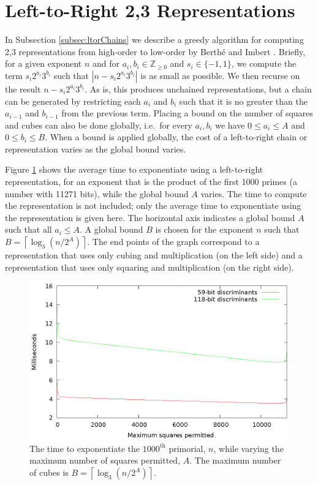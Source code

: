 \documentclass{ucalgthes1}
\theoremstyle{definition}
\newcommand{\ZZgez}{\mathbb{Z}_{\ge 0}}
\newcommand{\ceil}[1]{\left\lceil #1 \right\rceil}
\begin{document}
\section{Left-to-Right 2,3 Representations}
\label{sec:expL2RChains}

In Subsection \ref{subsec:ltorChains} we describe a greedy algorithm for computing 2,3 representations from high-order to low-order by Berth{\'e} and Imbert \cite{Berthe2009}.  Briefly, for a given exponent $n$ and for $a_i, b_i \in \ZZgez$ and \mbox{$s_i \in \{-1, 1\}$}, we compute the term $s_i2^{a_i}3^{b_i}$ such that $\left|n-s_i2^{a_i}3^{b_i}\right|$ is as small as possible.  We then recurse on the result $n - s_i2^{a_i}3^{b_i}$.  As is, this produces unchained representations, but a chain can be generated by restricting each $a_i$ and $b_i$ such that it is no greater than the $a_{i-1}$ and $b_{i-1}$ from the previous term.  Placing a bound on the number of squares and cubes can also be done globally, i.e.\ for every $a_i, b_i$ we have $0 \le a_i \le A$ and $0 \le b_i \le B$. When a bound is applied globally, the cost of a left-to-right chain or representation varies as the global bound varies.

Figure \ref{fig:dbnsL2rVaryBounds} shows the average time to exponentiate using a left-to-right representation, for an exponent that is the product of the first 1000 primes (a number with 11271 bits), while the global bound $A$ varies.  The time to compute the representation is not included; only the average time to exponentiate using the representation is given here.  The horizontal axis indicates a global bound $A$ such that all $a_i \le A$.  A global bound $B$ is chosen for the exponent $n$ such that $B = \ceil{\log_3(n/2^A)}$.  The end points of the graph correspond to a representation that uses only cubing and multiplication (on the left side) and a representation that uses only squaring and multiplication (on the right side).

\begin{figure}[htb]
\centering
\includegraphics{dbns_l2r_vary_max}
\caption[Global bounds on left-to-right 2,3 representations.]{The time to exponentiate the $1000^{\textrm{th}}$ primorial, $n$, while varying the maximum number of squares permitted, $A$. The maximum number of cubes is $B = \ceil{\log_3(n/2^A)}$.}
\label{fig:dbnsL2rVaryBounds}
\end{figure}
\end{document}
